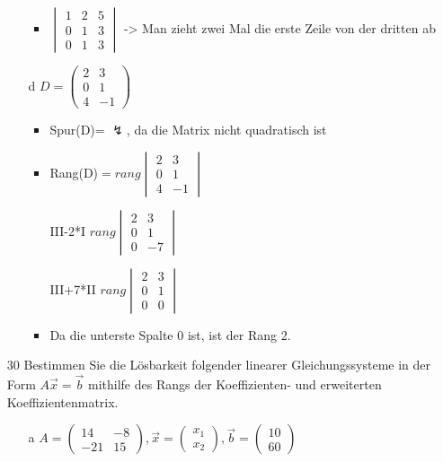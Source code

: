 \documentclass{article}
\begin{document}
\begin{itemize}
\begin{itemize}
\begin{itemize}
				\item{$\begin{vmatrix} 1 & 2 & 5 \\ 0 & 1 & 3 \\ 0 & 1 & 3 \end{vmatrix}$ -> Man zieht zwei Mal die erste Zeile von der dritten ab}
			\end{itemize}
			\item[d]{$D=\begin{pmatrix} 2 & 3 \\ 0 & 1 \\ 4 & -1 \end{pmatrix}$}
			\begin{itemize}
				\item{Spur(D)= $\lightning$, da die Matrix nicht quadratisch ist}
				\item{Rang(D)$= rang\begin{vmatrix} 2 & 3 \\ 0 & 1 \\ 4 & -1 \end{vmatrix}$}
				\item[III-2*I]{$rang \begin{vmatrix} 2 & 3 \\ 0 & 1 \\ 0 & -7 \end{vmatrix}$}
				\item[III+7*II]{$rang \begin{vmatrix} 2 & 3 \\ 0 & 1 \\ 0 & 0 \end{vmatrix}$}
				\item{Da die unterste Spalte 0 ist, ist der Rang 2.}
			\end{itemize}
		\end{itemize}
		\item[30]{Bestimmen Sie die Lösbarkeit folgender linearer Gleichungssysteme in der Form $A \vec{x}=\vec{b}$ mithilfe des Rangs der Koeffizienten- und erweiterten Koeffizientenmatrix.}
		\begin{itemize}
			\item[a]{$A=\begin{pmatrix} 14 & -8 \\ -21 & 15 \end{pmatrix}, \vec{x}=\begin{pmatrix} x_1 \\ x_2 \end{pmatrix}, \vec{b}=\begin{pmatrix} 10 \\ 60 \end{pmatrix}$}

\end{itemize}
\end{itemize}
\end{document}

